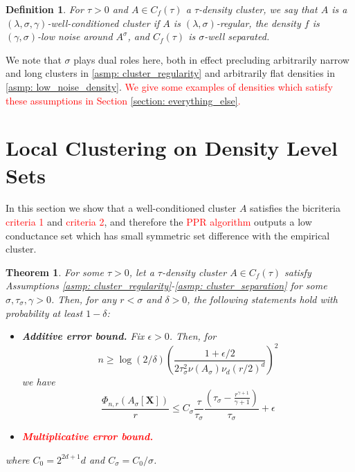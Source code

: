 \documentclass{article}
\newcommand{\Asig}{A_{\sigma}}
\newcommand{\1}{\mathbf{1}}
\theoremstyle{aldenthm}
\newtheorem{theorem}{Theorem}
\newtheorem{definition}{Definition}
\theoremstyle{remark}
\begin{document}
\begin{definition}
	For $\tau > 0$ and $A \in C_f(\tau)$ a $\tau$-density cluster, we say that $A$ is a \textit{$(\lambda, \sigma, \gamma)$-well-conditioned cluster} if $A$ is $(\lambda,\sigma)$-regular, the density $f$ is $(\gamma, \sigma)$-low noise around $A^{\sigma}$, and $C_f(\tau)$ is $\sigma$-well separated.
\end{definition}
We note that $\sigma$ plays dual roles here, both in effect precluding arbitrarily narrow and long clusters in \ref{asmp: cluster_regularity} and arbitrarily flat densities in \ref{asmp: low_noise_density}. \textcolor{red}{We give some examples of densities which satisfy these assumptions in Section \ref{section: everything_else}.}

\section{Local Clustering on Density Level Sets}

In this section we show that a well-conditioned cluster $A$ satisfies the bicriteria \textcolor{red}{criteria 1} and \textcolor{red}{criteria 2}, and therefore the \textcolor{red}{PPR algorithm} outputs a low conductance set  which has small symmetric set difference with the empirical cluster. 

\begin{theorem}
	\label{thm: conductance_upper_bound}
	For some $\tau > 0$, let a $\tau$-density cluster $A \in C_f(\tau)$ satisfy Assumptions \ref{asmp: cluster_regularity}-\ref{asmp: cluster_separation} for some $\sigma, \tau_{\sigma}, \gamma > 0$. Then, for any $r < \sigma$ and $\delta > 0$, the following statements hold with probability at least $1 - \delta$: 
	\begin{itemize}
		\item 
		\textbf{Additive error bound.} Fix $\epsilon > 0$. Then, for
		\begin{equation}
		\label{eqn: conductance_sample_complexity}
		n \geq \log(2/\delta)\left(\frac{1 + \epsilon/2}{2 \tau_{\sigma}^2 \nu(\Asig) \nu_d (r/2)^d}\right)^2 
		\end{equation}
		we have
		\begin{equation}
		\label{eqn: conductance_additive_error_bound}
		\frac{\Phi_{n,r}(\Asig[\mathbf{X}])}{r} \leq C_{\sigma} \frac{\tau}{\tau_{\sigma}} \frac{(\tau_{\sigma} - \frac{r^{\gamma+1}}{\gamma+1})}{\tau_{\sigma}} + \epsilon
		\end{equation}
		\item
		\textcolor{red}{\textbf{Multiplicative error bound.}}
	\end{itemize}
	where $C_0 = 2^{2d+1}d$ and $C_{\sigma} = C_0 / \sigma$. 
\end{theorem}
\end{document}
